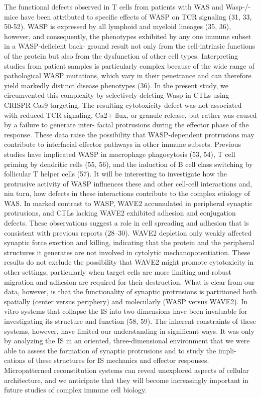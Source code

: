 The functional defects observed in T cells from patients with WAS and Wasp-/- mice have been attributed to specific effects of WASP on TCR signaling (31, 33, 50-52). WASP is expressed by all lymphoid and myeloid lineages (35, 36), however, and consequently, the phenotypes exhibited by any one immune subset in a WASP-deficient back- ground result not only from the cell-intrinsic functions of the protein but also from the dysfunction of other cell types. Interpreting studies from patient samples is particularly complex because of the wide range of pathological WASP mutations, which vary in their penetrance and can therefore yield markedly distinct disease phenotypes (36). In the present study, we circumvented this complexity by selectively deleting Wasp in CTLs using CRISPR-Cas9 targeting. The resulting cytotoxicity defect was not associated with reduced TCR signaling, Ca2+ flux, or granule release, but rather was caused by a failure to generate inter- facial protrusions during the effector phase of the response. These data raise the possibility that WASP-dependent protrusions may contribute to interfacial effector pathways in other immune subsets. Previous studies have implicated WASP in macrophage phagocytosis (53, 54), T cell priming by dendritic cells (55, 56), and the induction of B cell class switching by follicular T helper cells (57). It will be interesting to investigate how the protrusive activity of WASP influences these and other cell-cell interactions and, nin turn, how defects in these interactions contribute to the complex etiology of WAS. In marked contrast to WASP, WAVE2 accumulated in peripheral synaptic protrusions, and CTLs lacking WAVE2 exhibited adhesion and conjugation defects. These observations suggest a role in cell spreading and adhesion that is consistent with previous reports (28–30). WAVE2 depletion only weakly affected synaptic force exertion and killing, indicating that the protein and the peripheral structures it generates are not involved in cytolytic mechanopotentiation. These results do not exclude the possibility that WAVE2 might promote cytotoxicity in other settings, particularly when target cells are more limiting and robust migration and adhesion are required for their destruction. What is clear from our data, however, is that the functionality of synaptic protrusions is partitioned both spatially (center versus periphery) and molecularly (WASP versus WAVE2). In vitro systems that collapse the IS into two dimensions have been invaluable for investigating its structure and function (58, 59). The inherent constraints of these systems, however, have limited our understanding in significant ways. It was only by analyzing the IS in an oriented, three-dimensional environment that we were able to assess the formation of synaptic protrusions and to study the impli- cations of these structures for IS mechanics and effector responses. Micropatterned reconstitution systems can reveal unexplored aspects of cellular architecture, and we anticipate that they will become increasingly important in future studies of complex immune cell biology.

